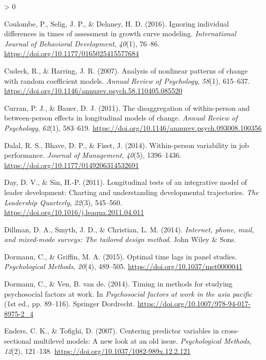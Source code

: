 \documentclass[
12pt, %
twoside,
english]{guelphthesis}
\newlength{\cslhangindent}
\newenvironment{CSLReferences}[2] %
 {%
  \setlength{\parindent}{0pt}
  \ifodd #1 \everypar{\setlength{\hangindent}{\cslhangindent}}\ignorespaces\fi
  \ifnum #2 > 0
  \setlength{\parskip}{\linespacing{2}}
  \fi
 }%
 {}
\theoremstyle{definition}
\theoremstyle{definition}
\theoremstyle{definition}
\theoremstyle{definition}
\theoremstyle{remark}
\begin{document}
\begin{CSLReferences}{1}{0}
\leavevmode{}%
Coulombe, P., Selig, J. P., \& Delaney, H. D. (2016). Ignoring individual differences in times of assessment in growth curve modeling. \emph{International Journal of Behavioral Development}, \emph{40}(1), 76--86. \url{https://doi.org/10.1177/0165025415577684}

\leavevmode{}%
Cudeck, R., \& Harring, J. R. (2007). Analysis of nonlinear patterns of change with random coefficient models. \emph{Annual Review of Psychology}, \emph{58}(1), 615--637. \url{https://doi.org/10.1146/annurev.psych.58.110405.085520}

\leavevmode{}%
Curran, P. J., \& Bauer, D. J. (2011). The disaggregation of within-person and between-person effects in longitudinal models of change. \emph{Annual Review of Psychology}, \emph{62}(1), 583--619. \url{https://doi.org/10.1146/annurev.psych.093008.100356}

\leavevmode{}%
Dalal, R. S., Bhave, D. P., \& Fiset, J. (2014). Within-person variability in job performance. \emph{Journal of Management}, \emph{40}(5), 1396--1436. \url{https://doi.org/10.1177/0149206314532691}

\leavevmode{}%
Day, D. V., \& Sin, H.-P. (2011). Longitudinal tests of an integrative model of leader development: Charting and understanding developmental trajectories. \emph{The Leadership Quarterly}, \emph{22}(3), 545--560. \url{https://doi.org/10.1016/j.leaqua.2011.04.011}

\leavevmode{}%
Dillman, D. A., Smyth, J. D., \& Christian, L. M. (2014). \emph{Internet, phone, mail, and mixed-mode surveys: The tailored design method}. John Wiley \& Sons.

\leavevmode{}%
Dormann, C., \& Griffin, M. A. (2015). Optimal time lags in panel studies. \emph{Psychological Methods}, \emph{20}(4), 489--505. \url{https://doi.org/10.1037/met0000041}

\leavevmode{}%
Dormann, C., \& Ven, B. van de. (2014). Timing in methods for studying psychosocial factors at work. In \emph{Psychosocial factors at work in the asia pacific} (1st ed., pp. 89--116). Springer Dordrecht. \url{https://doi.org/10.1007/978-94-017-8975-2_4}

\leavevmode{}%
Enders, C. K., \& Tofighi, D. (2007). Centering predictor variables in cross-sectional multilevel models: A new look at an old issue. \emph{Psychological Methods}, \emph{12}(2), 121--138. \url{https://doi.org/10.1037/1082-989x.12.2.121}


\end{CSLReferences}
\end{document}
